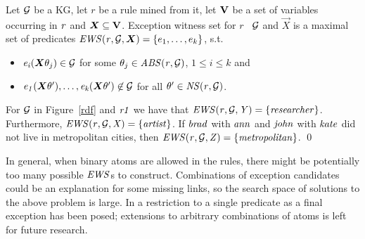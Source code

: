 

\begin{definition} \label{def:ews}
Let $\mathcal{G}$ be a KG, let $r$ be a rule mined from it, let ${\mathbf V}$ be a set of variables occurring in $\mathit{r}$ and $\vec{X}\subseteq \cV$. Exception witness set for $r$ \wrt\ $\mathcal{G}$ and $\vec{X}$ is a maximal set of predicates $\mi{EWS(r,\cG,\vec{X})}=\{e_1,\dotsc,e_k\}$, s.t.
\begin{itemize}
\item $\mi{e_i}(\vec{X}\theta_j)\in \cG$ for some $\theta_j\in \mathit{ABS(r,\mathcal{G})}$, $1 \leq i\leq k$ and
\item $\mi{e_1}(\vec{X}\theta'),\dotsc,\mi{e_k}(\vec{X}\theta')\not \in \cG$ for all $\theta' \in \mathit{NS(r,\mathcal{G})}$.
\end{itemize}
\end{definition}

\begin{example}
For $\mathcal{G}$ in Figure~\ref{rdf} and $\mathit{r1}$ 
we have that $\mathit{EWS(r,\mathcal{G},Y)}=\{\mathit{researcher}\}$. Furthermore,
 $\mathit{EWS(r,\mathcal{G},X)}=\{\mathit{artist}\}$. If $\mathit{brad}$ with $\mathit{ann}$ and $\mathit{john}$ with $\mathit{kate}$ did not live in %
metropolitan cities, then $\mathit{EWS(r,\mathcal{G},Z)}=\{\mathit{metropolitan}\}$. \qed
\end{example}
In general, when binary atoms are allowed in the rules, there might be potentially too many possible $\mathit{EWS}$s to construct. 
Combinations of exception candidates could be an explanation for some missing links, so the search space of solutions to the above problem is large. In \cite{rumis} a restriction to a single predicate as a final exception has been posed; extensions to arbitrary combinations of atoms is left for future research.





